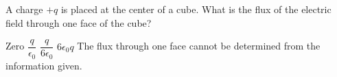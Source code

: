 \begin{questions}\setcounter{question}{21}\question
A charge $+q$ is placed at the center of a cube. What is the flux of the electric field through one face of the cube?

\begin{choices}
\choice Zero
\choice $\dfrac{q}{\epsilon_{0}}$
\choice $\dfrac{q}{6 \epsilon_{0}}$
\choice $6 \epsilon_{0} q$
\choice The flux through one face cannot be determined from the information given.
\end{choices}\end{questions}

